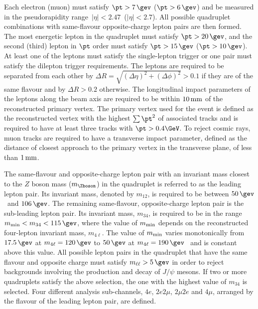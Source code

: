 \documentclass[final,3p,times,twocolumn]{elsarticle}
\begin{document}
  Each electron (muon) must satisfy $\pt>7\,\gev$ ($\pt>6\,\gev$) and
  be measured in the pseudorapidity
  range~$|\eta|<2.47$~($|\eta|<2.7$). 
  All possible quadruplet combinations with same-flavour opposite-charge lepton pairs are then formed.
  The most energetic lepton in the
  quadruplet must satisfy $\pt>20\,\gev$, and the second (third)
  lepton in $\pt$ order must satisfy $\pt >15\,\gev$ ($\pt
  >10\,\gev$). At least one of the leptons must satisfy the single-lepton 
  trigger or one pair must satisfy the dilepton trigger
  requirements. The leptons are required to be separated from each
  other by $\Delta R = \sqrt{(\Delta \eta)^{2} + (\Delta \phi)^{2}}>0.1$
  if they are of the same flavour and by $\Delta R>0.2$ otherwise. The
  longitudinal impact parameters of the leptons along the beam axis
  are required to be within $10\,{\rm mm}$ of the reconstructed
  primary vertex. The primary vertex used for the event is defined as the reconstructed
  vertex with the highest $\sum\pt^2$ of associated tracks and is
  required to have at least three tracks with $\pt > 0.4\GeV$. To
  reject cosmic rays, muon tracks are required to have a transverse
  impact parameter, defined as the distance of closest approach to
  the primary vertex in the transverse plane, of less than $1\,{\rm mm}$.

  The same-flavour and opposite-charge lepton pair
  with an invariant mass closest to the $Z$ boson mass ($m_{\Zboson}$)
  in the quadruplet is referred to as the leading lepton pair. Its invariant mass,
  denoted by $m_{12}$, is required to be between $50\,\gev$~and
  $106\,\gev$. The remaining same-flavour, opposite-charge lepton pair
  is the sub-leading lepton pair. Its invariant mass, $m_{34}$, is
  required to be in the range $m_{\rm{min}}<m_{34}<115\,\gev$, where
  the value of $m_{\rm{min}}$ depends on the reconstructed four-lepton
  invariant mass, $m_{4\ell}$. The value of $m_{\rm{min}}$ varies monotonically
  from $17.5\,\gev$ at $m_{4\ell}=120\,\gev$ to $50\,\gev$ at
  $m_{4\ell}=190\,\gev$~\cite{ATLAS-CONF-2012-092} and is constant above this value.  
  All possible lepton pairs in the quadruplet that have the 
  same flavour and opposite charge must satisfy
  $m_{\ell\ell}>5\,\gev$ in order to reject backgrounds involving the production and 
  decay of $J/\psi$ mesons. 
  If two or more quadruplets satisfy the above selection, the one with the highest
  value of $m_{34}$ is selected. Four different analysis sub-channels, $4e$,
  $2e2\mu$, $2\mu2e$ and $4\mu$, arranged by the flavour of the leading
  lepton pair, are defined.
\end{document}
